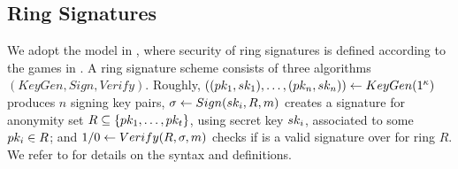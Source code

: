 



\subsection{Ring Signatures}
\label{ssec:related-models-rs}

We adopt the model in \cite{bkm06}, where security of ring signatures is
defined according to the games in . A ring signature
scheme consists of three algorithms $(KeyGen,Sign,Verify)$. Roughly,
$((pk_1,sk_1),\dots,(pk_n,sk_n)) \gets KeyGen(1^\kappa)$ produces $n$
signing key pairs, $\sigma \gets Sign(sk_i,R,m)$ creates a signature for
anonymity set $R \subseteq \lbrace pk_1, \dots, pk_t \rbrace$, using secret
key $sk_i$, associated to some $pk_i \in R$; and $1/0 \gets Verify(R,\sigma,
m)$ checks if \sig is a valid signature over \msg for ring $R$. We refer
to \cite{bkm06} for details on the syntax and definitions.

